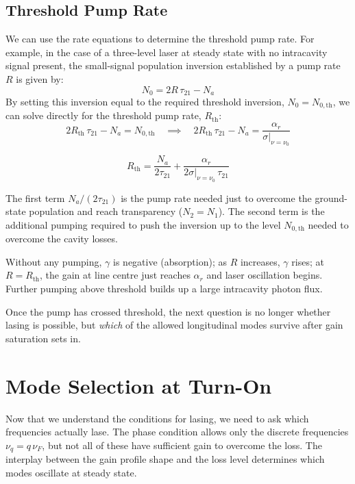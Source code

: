 \subsection{Threshold Pump Rate}

We can use the rate equations to determine the threshold pump rate. For example, in the case of a three-level laser at steady state with no intracavity signal present, the small-signal population inversion established by a pump rate $R$ is given by:
\begin{equation*}
    N_0 = 2R\,\tau_{21} - N_a
\end{equation*}
By setting this inversion equal to the required threshold inversion, $N_0 = N_{0,\text{th}}$, we can solve directly for the threshold pump rate, $R_{\text{th}}$:
\begin{equation*}
    2R_{\text{th}}\,\tau_{21} - N_a = N_{0,\text{th}} \quad\implies\quad 2R_{\text{th}}\,\tau_{21} - N_a = \frac{\alpha_r}{\sigma\big|_{\nu=\nu_0}}
\end{equation*}
\begin{keyresult}
    \begin{equation}
        R_{\text{th}} = \frac{N_a}{2\tau_{21}} + \frac{\alpha_r}{2\sigma\big|_{\nu=\nu_0}\,\tau_{21}}
    \end{equation}
\end{keyresult}

The first term $N_a/(2\tau_{21})$ is the pump rate needed just to overcome the ground-state population and reach transparency ($N_2 = N_1$). The second term is the additional pumping required to push the inversion up to the level $N_{0,\text{th}}$ needed to overcome the cavity losses.

Without any pumping, $\gamma$ is negative (absorption); as $R$ increases, $\gamma$ rises; at $R = R_{\text{th}}$, the gain at line centre just reaches $\alpha_r$ and laser oscillation begins. Further pumping above threshold builds up a large intracavity photon flux.

Once the pump has crossed threshold, the next question is no longer whether lasing is possible, but \emph{which} of the allowed longitudinal modes survive after gain saturation sets in.

\section{Mode Selection at Turn-On}

Now that we understand the conditions for lasing, we need to ask which frequencies actually lase. The phase condition allows only the discrete frequencies $\nu_q = q\,\nu_F$, but not all of these have sufficient gain to overcome the loss. The interplay between the gain profile shape and the loss level determines which modes oscillate at steady state.

